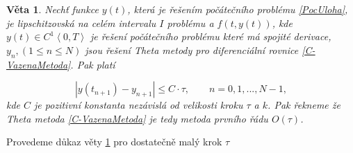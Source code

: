 \documentclass[a4paper,12pt,twoside]{article}
\newtheorem{veta}{Věta}[section]
\theoremstyle{definition}
\theoremstyle{remark}
\numberwithin{equation}{section}
\numberwithin{table}{section}
\numberwithin{figure}{section}
\begin{document}
\begin{veta} \label{RadEulerovyMetody}%
	Nechť funkce $y\left(t\right)$, která je řešením počátečního problému \eqref{PocUloha}, je lipschitzovská na celém intervalu $I$ problému a $f \left(t,y \left(t\right)\right)$, kde $y\left(t\right) \in C^{1}\left\langle 0, T\right\rangle$ je řešení počátečního problému které má spojité derivace,
	$y_{n}, \left(1 \leq n \leq N\right)$ jsou řešení Theta metody pro diferenciální rovnice \eqref{C-VazenaMetoda}. Pak platí
	
	\begin{equation}
		|y\left(t_{n+1}\right) - y_{n+1}| \leq C\cdot \tau, \qquad n = 0,1, ..., N-1,
	\end{equation} 
	kde $C$ je pozitivní konstanta nezávislá od velikosti kroku $\tau$  a $k$. Pak řekneme že Theta metoda \eqref{C-VazenaMetoda} je tedy metoda prvního řádu $O\left(\tau\right)$. \cite{Cangpin}
\end{veta}
Provedeme důkaz věty \ref{RadEulerovyMetody} pro dostatečně malý krok $\tau$
\end{document}
